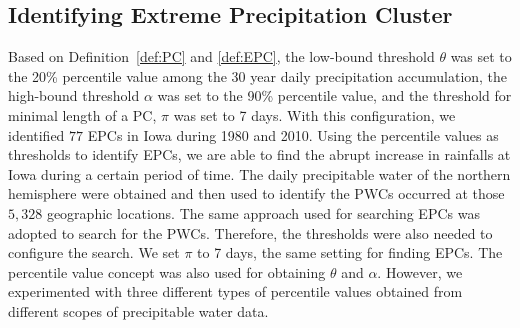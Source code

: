 \documentclass{acm_proc_article-sp}
\begin{document}
\subsection{Identifying Extreme Precipitation Cluster}
Based on Definition~\ref{def:PC} and \ref{def:EPC}, the low-bound threshold $\theta$ was set to the 20\% percentile value among the 30 year daily precipitation accumulation, the high-bound threshold $\alpha$ was set to the 90\% percentile value, and the threshold for
minimal length of a PC, $\pi$ was set to 7 days. With this configuration, we identified   $77$ EPCs in Iowa during 1980 and 2010. Using the percentile values as thresholds to identify EPCs, we are able to find the abrupt increase in rainfalls at Iowa during a certain period of time.
\newline 
The daily precipitable water of the northern hemisphere were obtained and then used to identify the PWCs occurred at those $5,328$ geographic locations. The same approach used for searching EPCs was adopted to search for the PWCs. Therefore, the thresholds were also needed to configure the search. We set $\pi$ to 7 days, the same setting for finding EPCs. The percentile value concept was also used for obtaining $\theta$ and $\alpha$. However, we experimented with three different types of percentile values obtained from different scopes of precipitable water data.
\end{document}
